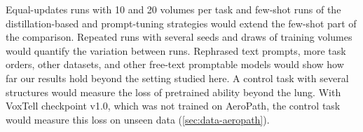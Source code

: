 Equal-updates runs with 10 and 20 volumes per task and few-shot runs of the distillation-based and prompt-tuning strategies would extend the few-shot part of the comparison.
Repeated runs with several seeds and draws of training volumes would quantify the variation between runs.
Rephrased text prompts, more task orders, other datasets, and other free-text promptable models would show how far our results hold beyond the setting studied here.
A control task with several structures would measure the loss of pretrained ability beyond the lung.
With VoxTell checkpoint v1.0, which was not trained on AeroPath, the control task would measure this loss on unseen data (\cref{sec:data-aeropath}).
